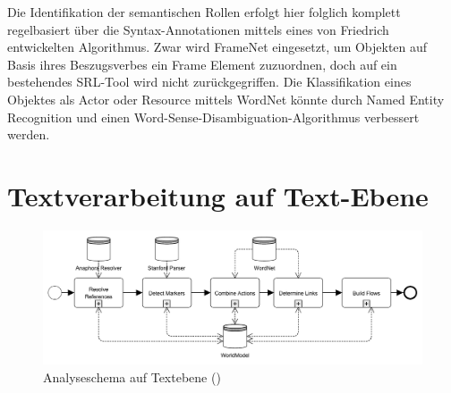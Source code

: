 \par
Die Identifikation der semantischen Rollen erfolgt hier folglich komplett regelbasiert über die Syntax-Annotationen mittels eines von Friedrich entwickelten Algorithmus. Zwar wird FrameNet eingesetzt, um Objekten auf Basis ihres Beszugsverbes ein Frame Element zuzuordnen, doch auf ein bestehendes \ac{SRL}-Tool wird nicht zurückgegriffen. Die Klassifikation eines Objektes als Actor oder Resource mittels WordNet könnte durch Named Entity Recognition und einen Word-Sense-Disambiguation-Algorithmus verbessert werden.

\section{Textverarbeitung auf Text-Ebene}
\label{subsec:TextLevel}

\begin{figure}[H]
\begin{center}
\includegraphics[keepaspectratio=true, width=\textwidth]{pictures/textLevel.png}
\caption{Analyseschema auf Textebene (\cite[vgl.][7]{FRIEDRICH2})}
\label{fig:TLEVEL}
\end{center}\end{figure}

